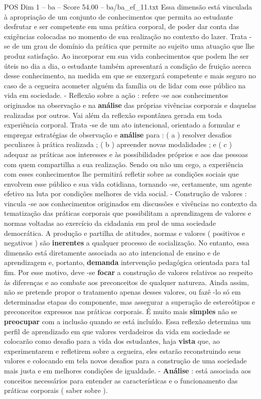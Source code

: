 \begin{textsample}{POS Dim 1 – ba – Score 54.00 – ba/ba\_ef\_11.txt}
Essa dimensão está vinculada à apropriação de um conjunto de conhecimentos que permita ao estudante desfrutar e ser competente em uma prática corporal, de poder dar conta das exigências colocadas no momento de sua realização no contexto do lazer.
Trata -se de um grau de domínio da prática que permite ao sujeito uma atuação que lhe produz satisfação.
Ao incorporar em sua vida conhecimentos que podem lhe ser úteis no dia a dia, o estudante também apresentará a condição de fruição acerca desse conhecimento, na medida em que se enxergará competente e mais seguro no caso de a cegueira acometer alguém da família ou de lidar com esse público na vida em sociedade. - Reflexão sobre a ação : refere -se aos conhecimentos originados na observação e na \textbf{análise} das próprias vivências corporais e daquelas realizadas por outros.
Vai além da reflexão espontânea gerada em toda experiência corporal.
Trata -se de um ato intencional, orientado a formular e empregar estratégias de observação e \textbf{análise} para : ( a ) resolver desafios peculiares à prática realizada ; ( b ) apreender novas modalidades ; e ( c ) adequar as práticas aos interesses e às possibilidades próprios e aos das pessoas com quem compartilha a sua realização.
Sendo ou não um cego, a experiência com esses conhecimentos lhe permitirá refletir sobre as condições sociais que envolvem esse público e sua vida cotidiana, tornando -se, certamente, um agente efetivo na luta por condições melhores de vida social. - Construção de valores : vincula -se aos conhecimentos originados em discussões e vivências no contexto da tematização das práticas corporais que possibilitam a aprendizagem de valores e normas voltadas ao exercício da cidadania em prol de uma sociedade democrática.
A produção e partilha de atitudes, normas e valores ( positivos e negativos ) são \textbf{inerentes} a qualquer processo de socialização.
No entanto, essa dimensão está diretamente associada ao ato intencional de ensino e de aprendizagem e, portanto, \textbf{demanda} intervenção pedagógica orientada para tal fim.
Por esse motivo, deve -se \textbf{focar} a construção de valores relativos ao respeito às diferenças e ao combate aos preconceitos de qualquer natureza.
Ainda assim, não se pretende propor o tratamento apenas desses valores, ou fazê -lo só em determinadas etapas do componente, mas assegurar a superação de estereótipos e preconceitos expressos nas práticas corporais.
É muito mais \textbf{simples} não se \textbf{preocupar} com a inclusão quando se está incluído.
Essa reflexão determina um perfil de aprendizado em que valores verdadeiros da vida em sociedade se colocarão como desafio para a vida dos estudantes, haja \textbf{vista} que, ao experimentarem e refletirem sobre a cegueira, eles estarão reconstruindo seus valores e colocando em tela novos desafios para a construção de uma sociedade mais justa e em melhores condições de igualdade. - \textbf{Análise} : está associada aos conceitos necessários para entender as características e o funcionamento das práticas corporais ( saber sobre ).

\end{textsample}
